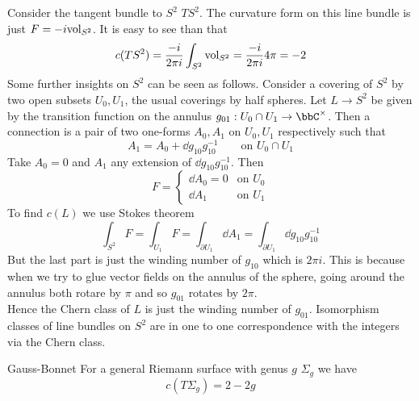 \begin{example}
    Consider the tangent bundle to $S^2$ $TS^2$. The curvature form on this line bundle is just $F=-i\rm{vol}_{S^2}$. It is easy to see than that 
    \begin{equation}
        c(TS^2)=\frac{-i}{2\pi i }\int_{S^2}\rm{vol}_{S^2}=\frac{-i}{2\pi i}4\pi=-2
    \end{equation}
    Some further insights on $S^2$ can be seen as follows. Consider a covering of $S^2$ by two open subsets $U_0,U_1$, the usual coverings by half spheres. Let $L\rightarrow S^2$ be given by the transition function on the annulus $g_{01}:U_0\cap U_1\rightarrow \bbC^\times$. Then a connection is a pair of two one-forms $A_0,A_1$ on $U_0,U_1$ respectively such that 
    \begin{equation}
        A_1=A_0+\dd{g}_{10}g_{10}^{-1}\qquad\text{on }U_0\cap U_1
    \end{equation}
    Take $A_0=0$ and $A_1$ any extension of $\dd{g}_{10}g_{10}^{-1}$. Then 
    \begin{equation}
        F=\begin{cases}
            \dd{A}_0=0&\text{on }U_0\\
            \dd{A}_1&\text{on }U_1
        \end{cases}
    \end{equation}
    To find $c(L)$ we use Stokes theorem 
    \begin{equation}
        \int_{S^2}F=\int_{U_1}F=\int_{\partial U_1}\dd{A}_1=\int_{\partial U_1}\dd{g}_{10}g_{10}^{-1}
    \end{equation}
    But the last part is just the winding number of $g_{10}$ which is $2\pi i$. This is because when we try to glue vector fields on the annulus of the sphere, going around the annulus both rotare by $\pi$ and so $g_{01}$ rotates by $2\pi$.\\
    Hence the Chern class of $L$ is just the winding number of $g_{01}$. Isomorphism classes of line bundles on $S^2$ are in one to one correspondence with the integers via the Chern class.
\end{example}
\begin{thm}{Gauss-Bonnet}{}
    For a general Riemann surface with genus $g$ $\Sigma_g$ we have
    \begin{equation}
        c(T\Sigma_g)=2-2g
    \end{equation}
\end{thm}

